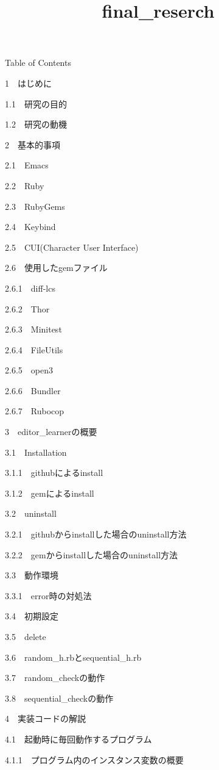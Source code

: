 \documentclass[11pt,dvipdfmx]{jsarticle}
\title{final\_reserch}
\begin{document}
    
    
    \maketitle
    
    

    
    Table of Contents{}

{{1~~}はじめに}

{{1.1~~}研究の目的}

{{1.2~~}研究の動機}

{{2~~}基本的事項}

{{2.1~~}Emacs}

{{2.2~~}Ruby}

{{2.3~~}RubyGems}

{{2.4~~}Keybind}

{{2.5~~}CUI(Character User Interface)}

{{2.6~~}使用したgemファイル}

{{2.6.1~~}diff-lcs}

{{2.6.2~~}Thor}

{{2.6.3~~}Minitest}

{{2.6.4~~}FileUtils}

{{2.6.5~~}open3}

{{2.6.6~~}Bundler}

{{2.6.7~~}Rubocop}

{{3~~}editor\_learnerの概要}

{{3.1~~}Installation}

{{3.1.1~~}githubによるinstall}

{{3.1.2~~}gemによるinstall}

{{3.2~~}uninstall}

{{3.2.1~~}githubからinstallした場合のuninstall方法}

{{3.2.2~~}gemからinstallした場合のuninstall方法}

{{3.3~~}動作環境}

{{3.3.1~~}error時の対処法}

{{3.4~~}初期設定}

{{3.5~~}delete}

{{3.6~~}random\_h.rbとsequential\_h.rb}

{{3.7~~}random\_checkの動作}

{{3.8~~}sequential\_checkの動作}

{{4~~}実装コードの解説}

{{4.1~~}起動時に毎回動作するプログラム}

{{4.1.1~~}プログラム内のインスタンス変数の概要}
\end{document}
